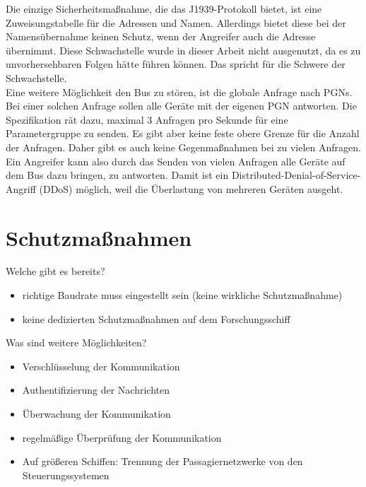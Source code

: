 Die einzige Sicherheitsmaßnahme, die das J1939-Protokoll bietet, ist eine Zuweisungstabelle für die Adressen und Namen. Allerdings
bietet diese bei der Namensübernahme keinen Schutz, wenn der Angreifer auch die Adresse übernimmt. Diese Schwachstelle 
wurde in dieser Arbeit nicht ausgenutzt, da es zu unvorhersehbaren Folgen hätte führen können. Das spricht für die 
Schwere der Schwachstelle.\\
Eine weitere Möglichkeit den Bus zu stören, ist die globale Anfrage nach PGNs. Bei einer solchen Anfrage sollen alle Geräte
mit der eigenen PGN antworten. Die Spezifikation rät dazu, maximal 3 Anfragen pro Sekunde für eine Parametergruppe zu senden.
Es gibt aber keine feste obere Grenze für die Anzahl der Anfragen. Daher gibt es auch keine Gegenmaßnahmen bei zu vielen 
Anfragen. Ein Angreifer kann also durch das Senden von vielen Anfragen alle Geräte auf dem Bus dazu bringen, zu antworten.
Damit ist ein Distributed-Denial-of-Service-Angriff (DDoS) möglich, weil die Überlastung von mehreren Geräten ausgeht. \\
\cite{Murvay2018}


\section{Schutzmaßnahmen}
Welche gibt es bereits?
\begin{itemize}
    \item richtige Baudrate muss eingestellt sein (keine wirkliche Schutzmaßnahme)
    \item keine dedizierten Schutzmaßnahmen auf dem Forschungsschiff
\end{itemize}
Was sind weitere Möglichkeiten?
\begin{itemize}
    \item Verschlüsselung der Kommunikation
    \item Authentifizierung der Nachrichten
    \item Überwachung der Kommunikation
    \item regelmäßige Überprüfung der Kommunikation
    \item Auf größeren Schiffen: Trennung der Passagiernetzwerke von den Steuerungssystemen
\end{itemize}

